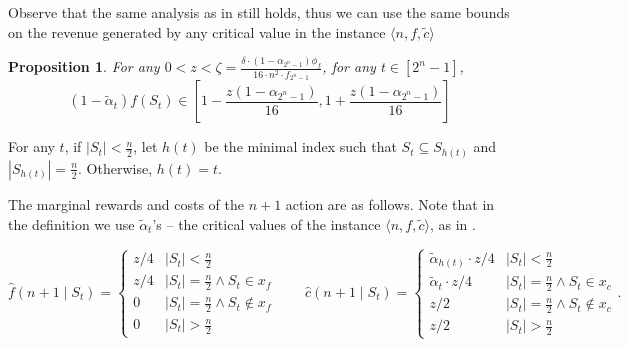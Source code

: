 \documentclass[11pt]{article}
\newtheorem{proposition}{Proposition}
\newcommand{\inst}[3]{\langle #1, #2, #3 \rangle}
\newcommand{\tc}{\tilde{c}}
\newcommand{\talpha}{\tilde{\alpha}}
\newcommand{\hf}{\hat{f}}
\newcommand{\hc}{\hat{c}}
\begin{document}
Observe that the same analysis as in  still holds, thus we can use the same bounds on the revenue generated by any critical value in the instance $\inst{n}{f}{\tc}$

\begin{proposition}\label{prop:eps_for_revenue_bound_supMod_c}
For any $0 < z < \zeta = \frac{\delta \cdot (1-\alpha_{2^n-1}) \phi_f}{16\cdot n^2 \cdot f_{2^n-1}}$, for any $t \in [2^n-1]$, 
$$
(1-\talpha_t)f(S_t) \in \left[1 - \frac{z(1-\alpha_{2^n-1})}{16}, 1 + \frac{z(1-\alpha_{2^n-1})}{16} \right]
$$
\end{proposition}

For any $t$, if $|S_t| < \frac{n}{2}$, let $h(t)$ be the minimal index such that $S_t \subseteq S_{h(t)}$ and $|S_{h(t)}|=\frac{n}{2}$. Otherwise, $h(t)=t$.

The marginal rewards and costs of the $n+1$ action are as follows. Note that in the definition we use $\talpha_t$'s --  the critical values of the instance $\inst{n}{f}{\tc}$, as in .

$$
\hf(n+1 \mid S_t) = 
\begin{cases}
    z/4 & |S_t| < \frac{n}{2} \\
    z/4 & |S_t| = \frac{n}{2} \land S_t \in x_f \\
    0 & |S_t| = \frac{n}{2} \land S_t \notin x_f \\
    0 & |S_t| > \frac{n}{2}
\end{cases}
\qquad 
\hc(n+1 \mid S_t) = 
\begin{cases}
    \talpha_{h(t)} \cdot z/4 & |S_t| < \frac{n}{2} \\
    \talpha_{t} \cdot z/4 & |S_t| = \frac{n}{2} \land S_t \in x_c \\
    z/2 & |S_t| = \frac{n}{2} \land S_t \notin x_c \\
    z/2 & |S_t| > \frac{n}{2}
\end{cases}.
$$
\end{document}
